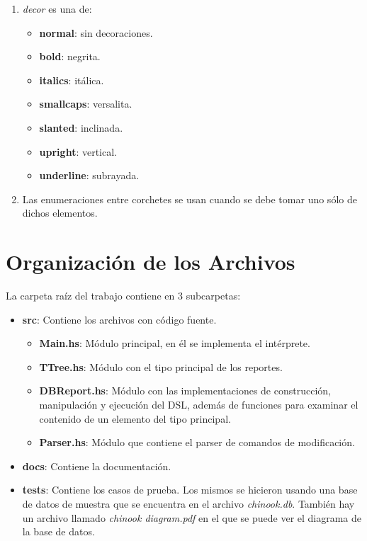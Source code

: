\documentclass[a4paper,12pt]{article}
\begin{document}
\begin{enumerate}
\item \textit{decor} es una de:
	\begin{itemize}
	\item \textbf{normal}: sin decoraciones.
    \item \textbf{bold}: negrita.
	\item \textbf{italics}: itálica. 
	\item \textbf{smallcaps}: versalita.
	\item \textbf{slanted}: inclinada.
	\item \textbf{upright}: vertical.
	\item \textbf{underline}: subrayada.
	\end{itemize}
\item Las enumeraciones entre corchetes se usan cuando se debe tomar uno sólo de dichos elementos.
\end{enumerate}
\section{Organización de los Archivos}
La carpeta raíz del trabajo contiene en 3 subcarpetas:\\
\begin{itemize}
\item \textbf{src}: Contiene los archivos con código fuente.
	\begin{itemize}
	\item \textbf{Main.hs}: Módulo principal, en él se implementa el intérprete.
	\item \textbf{TTree.hs}: Módulo con el tipo principal de los reportes.
	\item \textbf{DBReport.hs}: Módulo con las implementaciones de construcción, manipulación y ejecución del DSL, además de funciones para examinar el contenido de un elemento del tipo principal.
	\item \textbf{Parser.hs}: Módulo que contiene el parser de comandos de modificación.
	\end{itemize}
\item \textbf{docs}: Contiene la documentación.
\item \textbf{tests}: Contiene los casos de prueba. Los mismos se hicieron usando una base de datos de muestra que se encuentra en el archivo \textit{chinook.db}. También hay un archivo llamado \textit{chinook diagram.pdf} en el que se puede ver el diagrama de la base de datos.
\end{itemize}
\end{document}
